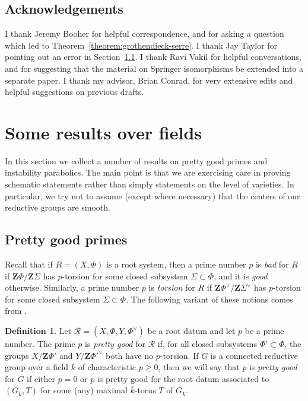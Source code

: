 \documentclass[11pt,reqno]{amsart}
\theoremstyle{definition}
\newtheorem{definition}[theorem]{Definition}
\newcommand{\bZ}{{\mathbf Z}}
\newcommand{\sR}{{\mathscr R}}
\begin{document}
\subsection{Acknowledgements}

I thank Jeremy Booher for helpful correspondence, and for asking a question which led to Theorem~\ref{theorem:grothendieck-serre}. I thank Jay Taylor for pointing out an error in Section~\ref{subsection:pretty-good}. I thank Ravi Vakil for helpful conversations, and for suggesting that the material on Springer isomorphisms be extended into a separate paper. I thank my advisor, Brian Conrad, for very extensive edits and helpful suggestions on previous drafts.













\section{Some results over fields}

In this section we collect a number of results on pretty good primes and instability parabolics. The main point is that we are exercising care in proving schematic statements rather than simply statements on the level of varieties. In particular, we try not to assume (except where necessary) that the centers of our reductive groups are smooth.

\subsection{Pretty good primes}\label{subsection:pretty-good}

Recall \cite[I, \S 4.4]{Springer-Steinberg} that if $R = (X, \Phi)$ is a root system, then a prime number $p$ is \textit{bad} for $R$ if $\bZ\Phi/\bZ\Sigma$ has $p$-torsion for some closed subsystem $\Sigma \subset \Phi$, and it is \textit{good} otherwise. Similarly, a prime number $p$ is \textit{torsion} for $R$ if $\bZ\Phi^\vee/\bZ\Sigma^\vee$ has $p$-torsion for some closed subsystem $\Sigma \subset \Phi$. The following variant of these notions comes from \cite{Herpel}.

\begin{definition}
Let $\sR = (X, \Phi, Y, \Phi^\vee)$ be a root datum \cite[Exp.\ XXI, D\'ef.\ 1.1.1]{SGA3} and let $p$ be a prime number. The prime $p$ is \textit{pretty good} for $\sR$ if, for all closed subsystems $\Phi' \subset \Phi$, the groups $X/\bZ\Phi'$ and $Y/\bZ\Phi'^\vee$ both have no $p$-torsion. If $G$ is a connected reductive group over a field $k$ of characteristic $p \geq 0$, then we will say that $p$ is \textit{pretty good} for $G$ if either $p=0$ or $p$ is pretty good for the root datum associated to $(G_{\overline{k}}, T)$ for some (any) maximal $\overline{k}$-torus $T$ of $G_{\overline{k}}$.
\end{definition}
\end{document}
